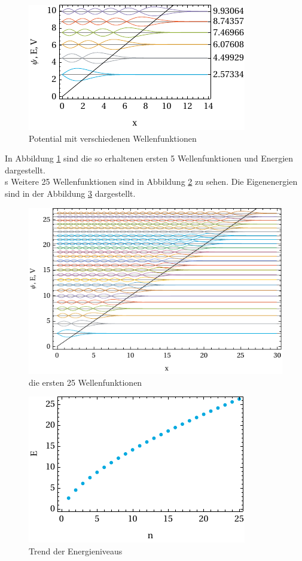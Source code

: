 \begin{figure}
	\centering
	\includegraphics[scale = 1.388888888]{img/out.pdf}
	\caption{Potential mit verschiedenen Wellenfunktionen}
	\label{fig:out}
\end{figure}
In Abbildung \ref{fig:out} sind die so erhaltenen ersten 5 Wellenfunktionen und Energien dargestellt.\\s
Weitere 25 Wellenfunktionen sind in Abbildung \ref{fig:large} zu sehen. Die Eigenenergien sind in der Abbildung \ref{fig:trend} dargestellt.\smallskip

\clearpage
\begin{figure}
	\centering
	\includegraphics[scale = 1.388888888]{img/large.pdf}
	\caption{die ersten 25 Wellenfunktionen}
	\label{fig:large}
\end{figure}
\begin{figure}
	\centering
	\includegraphics[scale = 1.388888888]{img/trend.pdf}
	\caption{Trend der Energieniveaus}
	\label{fig:trend}
\end{figure}


